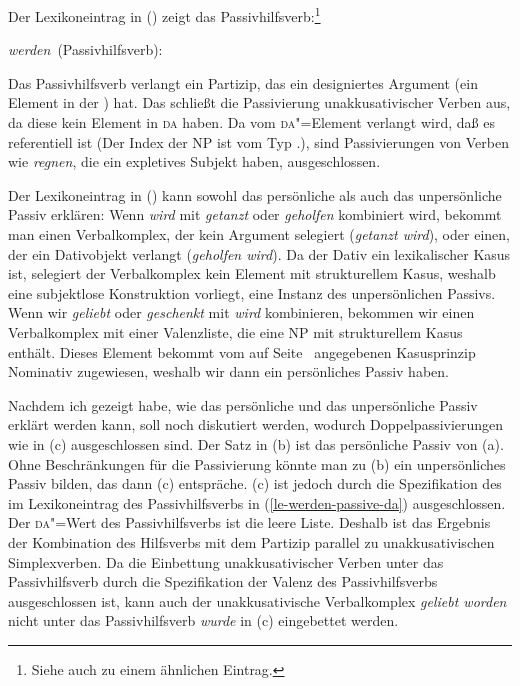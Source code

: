 Der Lexikoneintrag in () zeigt das Passivhilfsverb:\footnote{
  Siehe auch  zu einem ähnlichen Eintrag.%
}

\eas
\label{le-werden-passive-da}
\mbox{\emph{werden} (Passivhilfsverb):}\\
\zs

\noindent
Das Passivhilfsverb verlangt ein Partizip, das ein designiertes Argument (ein Element in der \dalist) hat.
Das schließt die Passivierung unakkusativischer Verben aus, da diese kein Element in \textsc{da} haben.
Da vom \textsc{da}"=Element verlangt wird, daß es referentiell ist (Der Index der NP ist vom Typ
.), sind Passivierungen von Verben wie \emph{regnen}, die ein expletives Subjekt haben, ausgeschlossen.

Der Lexikoneintrag in () kann sowohl das persönliche als auch das unpersönliche Passiv
erklären: Wenn \emph{wird} mit \emph{getanzt} oder \emph{geholfen} kombiniert wird,
bekommt man einen Verbalkomplex, der kein Argument selegiert (\emph{getanzt wird}), 
oder einen, der ein Dativobjekt verlangt (\emph{geholfen wird}). Da der Dativ ein lexikalischer
Kasus ist, selegiert der Verbalkomplex kein Element mit strukturellem Kasus, weshalb eine
subjektlose Konstruktion vorliegt, \dash eine Instanz des unpersönlichen Passivs.
Wenn wir \emph{geliebt} oder \emph{geschenkt} mit \emph{wird} kombinieren, bekommen
wir einen Verbalkomplex mit einer Valenzliste, die eine NP mit strukturellem Kasus enthält.
Dieses Element bekommt vom auf Seite~\pageref{case-p} angegebenen Kasusprinzip
Nominativ zugewiesen, weshalb wir dann ein persönliches Passiv haben.

Nachdem ich gezeigt habe, wie das persönliche und das unpersönliche Passiv erklärt werden
kann, soll noch diskutiert werden, wodurch Doppelpassivierungen wie in (c) ausgeschlossen sind.
\eal
\label{ex-double-application-of-passive}
\zl
Der Satz in (b) ist das persönliche Passiv von (a). Ohne Beschränkungen
für die Passivierung könnte man zu (b) ein unpersönliches Passiv bilden, das dann (c)
entspräche. (c) ist jedoch durch die Spezifikation des \dawes im Lexikoneintrag
des Passivhilfsverbs in (\ref{le-werden-passive-da}) ausgeschlossen. Der \textsc{da}"=Wert des Passivhilfsverbs
ist die leere Liste. Deshalb ist das Ergebnis der Kombination des Hilfsverbs mit dem Partizip parallel
zu unakkusativischen Simplexverben. Da die Einbettung unakkusativischer Verben unter das
Passivhilfsverb durch die Spezifikation der Valenz des Passivhilfsverbs ausgeschlossen ist,
kann auch der unakkusativische Verbalkomplex \emph{geliebt worden} nicht unter 
das Passivhilfsverb \emph{wurde} in (c) eingebettet werden.

